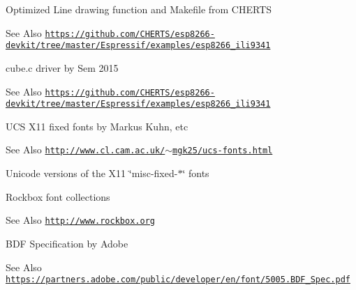 \begin{DoxyParagraph}{Optimized Line drawing function and Makefile from C\-H\-E\-R\-T\-S}

\end{DoxyParagraph}
\begin{DoxySeeAlso}{See Also}
\href{https://github.com/CHERTS/esp8266-devkit/tree/master/Espressif/examples/esp8266_ili9341}{\tt https\-://github.\-com/\-C\-H\-E\-R\-T\-S/esp8266-\/devkit/tree/master/\-Espressif/examples/esp8266\-\_\-ili9341}
\end{DoxySeeAlso}


 \begin{DoxyParagraph}{cube.c driver by Sem 2015}

\end{DoxyParagraph}
\begin{DoxySeeAlso}{See Also}
\href{https://github.com/CHERTS/esp8266-devkit/tree/master/Espressif/examples/esp8266_ili9341}{\tt https\-://github.\-com/\-C\-H\-E\-R\-T\-S/esp8266-\/devkit/tree/master/\-Espressif/examples/esp8266\-\_\-ili9341}
\end{DoxySeeAlso}


 \begin{DoxyParagraph}{U\-C\-S X11 fixed fonts by Markus Kuhn, etc}

\end{DoxyParagraph}
\begin{DoxySeeAlso}{See Also}
\href{http://www.cl.cam.ac.uk/~mgk25/ucs-fonts.html}{\tt http\-://www.\-cl.\-cam.\-ac.\-uk/$\sim$mgk25/ucs-\/fonts.\-html}
\begin{DoxyItemize}
\item Unicode versions of the X11 \char`\"{}misc-\/fixed-\/$\ast$\char`\"{} fonts
\end{DoxyItemize}
\end{DoxySeeAlso}


 \begin{DoxyParagraph}{Rockbox font collections}

\end{DoxyParagraph}
\begin{DoxySeeAlso}{See Also}
\href{http://www.rockbox.org}{\tt http\-://www.\-rockbox.\-org}
\end{DoxySeeAlso}


 \begin{DoxyParagraph}{B\-D\-F Specification by Adobe}

\end{DoxyParagraph}
\begin{DoxySeeAlso}{See Also}
\href{https://partners.adobe.com/public/developer/en/font/5005.BDF_Spec.pdf}{\tt https\-://partners.\-adobe.\-com/public/developer/en/font/5005.\-B\-D\-F\-\_\-\-Spec.\-pdf} 
\end{DoxySeeAlso}
